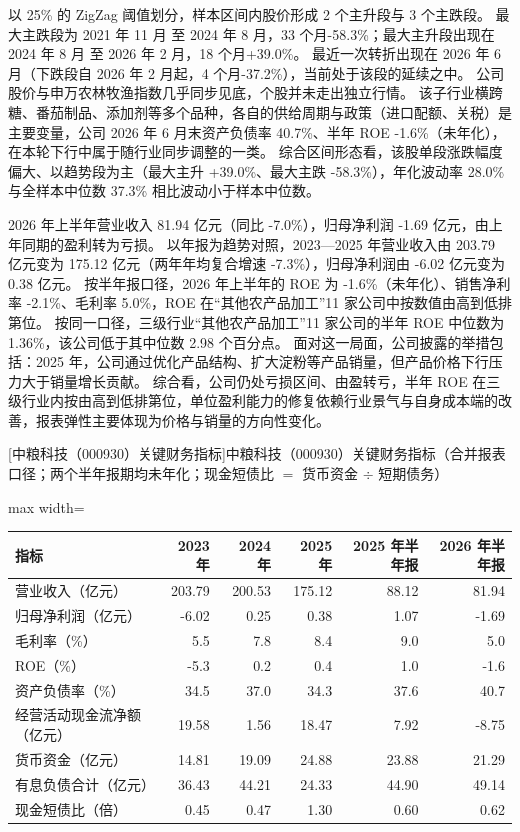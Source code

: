  以 25\% 的 ZigZag 阈值划分，样本区间内股价形成 2 个主升段与 3 个主跌段。 最大主跌段为 2021 年 11 月 至 2024 年 8 月，33 个月-58.3\%；最大主升段出现在 2024 年 8 月 至 2026 年 2 月，18 个月+39.0\%。 最近一次转折出现在 2026 年 6 月（下跌段自 2026 年 2 月起，4 个月-37.2\%），当前处于该段的延续之中。 公司股价与申万农林牧渔指数几乎同步见底，个股并未走出独立行情。 该子行业横跨糖、番茄制品、添加剂等多个品种，各自的供给周期与政策（进口配额、关税）是主要变量，公司 2026 年 6 月末资产负债率 40.7\%、半年 ROE -1.6\%（未年化），在本轮下行中属于随行业同步调整的一类。 综合区间形态看，该股单段涨跌幅度偏大、以趋势段为主（最大主升 +39.0\%、最大主跌 -58.3\%），年化波动率 28.0\% 与全样本中位数 37.3\% 相比波动小于样本中位数。

 2026 年上半年营业收入 81.94 亿元（同比 -7.0\%），归母净利润 -1.69 亿元，由上年同期的盈利转为亏损。 以年报为趋势对照，2023---2025 年营业收入由 203.79 亿元变为 175.12 亿元（两年年均复合增速 -7.3\%），归母净利润由 -6.02 亿元变为 0.38 亿元。 按半年报口径，2026 年上半年的 ROE 为 -1.6\%（未年化）、销售净利率 -2.1\%、毛利率 5.0\%，ROE 在“其他农产品加工”11 家公司中按数值由高到低排第位。 按同一口径，三级行业“其他农产品加工”11 家公司的半年 ROE 中位数为 1.36\%，该公司低于其中位数 2.98 个百分点。 面对这一局面，公司披露的举措包括：2025 年，公司通过优化产品结构、扩大淀粉等产品销量，但产品价格下行压力大于销量增长贡献。 综合看，公司仍处亏损区间、由盈转亏，半年 ROE 在三级行业内按由高到低排第位，单位盈利能力的修复依赖行业景气与自身成本端的改善，报表弹性主要体现为价格与销量的方向性变化。

\begin{center}\small\setlength{\tabcolsep}{3.4pt}
[中粮科技（000930）关键财务指标]{中粮科技（000930）关键财务指标（合并报表口径；两个半年报期均未年化；现金短债比 $=$ 货币资金 $\div$ 短期债务）}
\begin{adjustbox}{max width=\textwidth}
\begin{tabular}{@{}lrrrrr@{}}
\toprule
指标 & 2023 年 & 2024 年 & 2025 年 & 2025 年半年报 & 2026 年半年报 \\
\midrule
营业收入（亿元） & 203.79 & 200.53 & 175.12 & 88.12 & 81.94 \\
归母净利润（亿元） & -6.02 & 0.25 & 0.38 & 1.07 & -1.69 \\
毛利率（\%） & 5.5 & 7.8 & 8.4 & 9.0 & 5.0 \\
ROE（\%） & -5.3 & 0.2 & 0.4 & 1.0 & -1.6 \\
资产负债率（\%） & 34.5 & 37.0 & 34.3 & 37.6 & 40.7 \\
经营活动现金流净额（亿元） & 19.58 & 1.56 & 18.47 & 7.92 & -8.75 \\
货币资金（亿元） & 14.81 & 19.09 & 24.88 & 23.88 & 21.29 \\
有息负债合计（亿元） & 36.43 & 44.21 & 24.33 & 44.90 & 49.14 \\
现金短债比（倍） & 0.45 & 0.47 & 1.30 & 0.60 & 0.62 \\
\bottomrule
\end{tabular}
\end{adjustbox}
\end{center}


